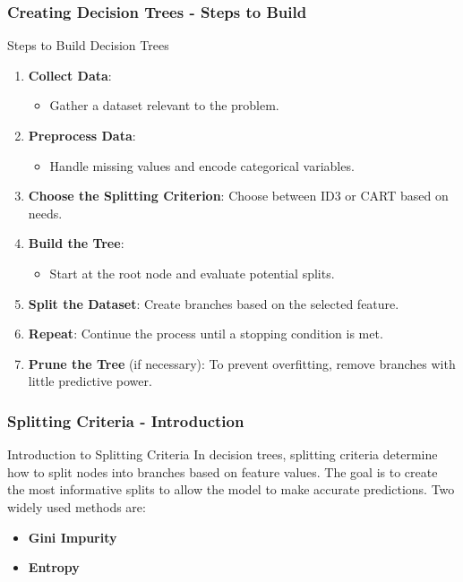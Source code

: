 \documentclass[aspectratio=169]{beamer}
\begin{document}
\begin{frame}[fragile]
    \frametitle{Creating Decision Trees - Steps to Build}
    \begin{block}{Steps to Build Decision Trees}
        \begin{enumerate}
            \item \textbf{Collect Data}:
                \begin{itemize}
                    \item Gather a dataset relevant to the problem.
                \end{itemize}
            \item \textbf{Preprocess Data}:
                \begin{itemize}
                    \item Handle missing values and encode categorical variables.
                \end{itemize}
            \item \textbf{Choose the Splitting Criterion}: Choose between ID3 or CART based on needs.
            \item \textbf{Build the Tree}:
                \begin{itemize}
                    \item Start at the root node and evaluate potential splits.
                \end{itemize}
            \item \textbf{Split the Dataset}: Create branches based on the selected feature.
            \item \textbf{Repeat}: Continue the process until a stopping condition is met.
            \item \textbf{Prune the Tree} (if necessary): To prevent overfitting, remove branches with little predictive power.
        \end{enumerate}
    \end{block}
\end{frame}

\begin{frame}[fragile]
  \frametitle{Splitting Criteria - Introduction}
  \begin{block}{Introduction to Splitting Criteria}
    In decision trees, splitting criteria determine how to split nodes into branches based on feature values. The goal is to create the most informative splits to allow the model to make accurate predictions. Two widely used methods are:
    \begin{itemize}
      \item \textbf{Gini Impurity}
      \item \textbf{Entropy}
    \end{itemize}
  \end{block}
\end{frame}
\end{document}
